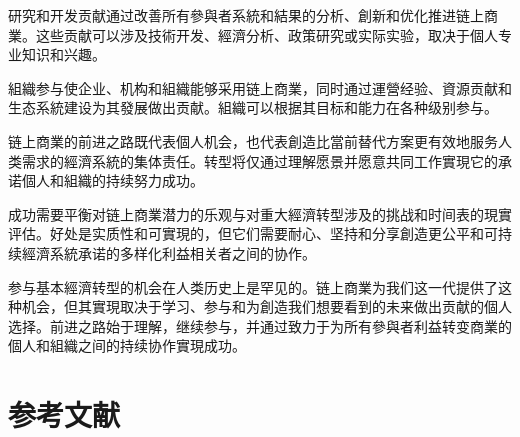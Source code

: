 \documentclass[
  Letterpaper,
]{scrbook}
\begin{document}
研究和开发贡献通过改善所有參與者系統和結果的分析、創新和优化推进链上商業。这些贡献可以涉及技術开发、經濟分析、政策研究或实际实验，取决于個人专业知识和兴趣。

組織参与使企业、机构和組織能够采用链上商業，同时通过運營经验、資源贡献和生态系統建设为其發展做出贡献。組織可以根据其目标和能力在各种级别参与。

链上商業的前进之路既代表個人机会，也代表創造比當前替代方案更有效地服务人类需求的經濟系統的集体责任。转型将仅通过理解愿景并愿意共同工作實現它的承诺個人和組織的持续努力成功。

成功需要平衡对链上商業潜力的乐观与对重大經濟转型涉及的挑战和时间表的現實评估。好处是实质性和可實現的，但它们需要耐心、坚持和分享創造更公平和可持续經濟系統承诺的多样化利益相关者之间的协作。

参与基本經濟转型的机会在人类历史上是罕见的。链上商業为我们这一代提供了这种机会，但其實現取决于学习、参与和为創造我们想要看到的未来做出贡献的個人选择。前进之路始于理解，继续参与，并通过致力于为所有參與者利益转变商業的個人和組織之间的持续协作實現成功。


\chapter*{参考文献}\label{ux53c2ux8003ux6587ux732e}

\end{document}
